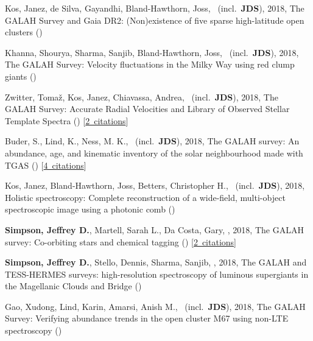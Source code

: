 \item[{\color{numcolor}\scriptsize8}] Kos, Janez, de Silva, Gayandhi, Bland-Hawthorn, Joss, \etal\ (incl.\ \textbf{JDS}), 2018, The GALAH Survey and Gaia DR2: (Non)existence of five sparse high-latitude open clusters ()

\item[{\color{numcolor}\scriptsize7}] Khanna, Shourya, Sharma, Sanjib, Bland-Hawthorn, Joss, \etal\ (incl.\ \textbf{JDS}), 2018, The GALAH Survey: Velocity fluctuations in the Milky Way using red clump giants ()

\item[{\color{numcolor}\scriptsize6}] Zwitter, Toma{\v{z}}, Kos, Janez, Chiavassa, Andrea, \etal\ (incl.\ \textbf{JDS}), 2018, The GALAH Survey: Accurate Radial Velocities and Library of Observed Stellar Template Spectra () [\href{https://ui.adsabs.harvard.edu/#abs/2018arXiv180406344Z}{2~citations}]

\item[{\color{numcolor}\scriptsize5}] Buder, S., Lind, K., Ness, M. K., \etal\ (incl.\ \textbf{JDS}), 2018, The GALAH survey: An abundance, age, and kinematic inventory of the solar neighbourhood made with TGAS () [\href{https://ui.adsabs.harvard.edu/#abs/2018arXiv180405869B}{4~citations}]

\item[{\color{numcolor}\scriptsize4}] Kos, Janez, Bland-Hawthorn, Joss, Betters, Christopher H., \etal\ (incl.\ \textbf{JDS}), 2018, Holistic spectroscopy: Complete reconstruction of a wide-field, multi-object spectroscopic image using a photonic comb ()

\item[{\color{numcolor}\scriptsize3}] \textbf{Simpson, Jeffrey D.}, Martell, Sarah L., Da Costa, Gary, \etal, 2018, The GALAH survey: Co-orbiting stars and chemical tagging () [\href{https://ui.adsabs.harvard.edu/#abs/2018arXiv180405894S}{2~citations}]

\item[{\color{numcolor}\scriptsize2}] \textbf{Simpson, Jeffrey D.}, Stello, Dennis, Sharma, Sanjib, \etal, 2018, The GALAH and TESS-HERMES surveys: high-resolution spectroscopy of luminous supergiants in the Magellanic Clouds and Bridge ()

\item[{\color{numcolor}\scriptsize1}] Gao, Xudong, Lind, Karin, Amarsi, Anish M., \etal\ (incl.\ \textbf{JDS}), 2018, The GALAH Survey: Verifying abundance trends in the open cluster M67 using non-LTE spectroscopy ()